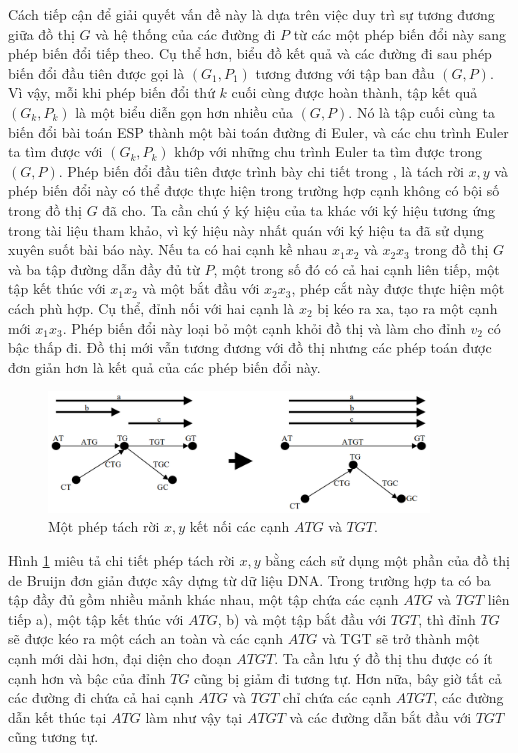 \documentclass[14pt, a4paper]{article}
\numberwithin{equation}{section}
\numberwithin{figure}{section}
\numberwithin{dl}{section}
\numberwithin{md}{section}
\numberwithin{bd}{section}
\numberwithin{dn}{section}
\numberwithin{hq}{section}
\begin{document}
    Cách tiếp cận để giải quyết vấn đề này là dựa trên việc duy trì sự tương đương giữa đồ thị $G$ và hệ thống của các đường đi $P$ từ các một phép biến đổi này sang phép biến đổi tiếp theo.
    Cụ thể hơn, biểu đồ kết quả và các đường đi sau phép biến đổi đầu tiên được gọi là $(G_1, P_1)$ tương đương với tập ban đầu $(G, P)$.
    Vì vậy, mỗi khi phép biến đổi thứ $k$ cuối cùng được hoàn thành, tập kết quả $(G_k, P_k)$ là một biểu diễn gọn hơn nhiều của $(G, P)$.
    Nó là tập cuối cùng ta biến đổi bài toán ESP thành một bài toán đường đi Euler, và các chu trình Euler ta tìm được với $(G_k, P_k)$ khớp với những chu trình Euler ta tìm được trong $(G, P)$.
    Phép biến đổi đầu tiên được trình bày chi tiết trong \cite{pevzner2001eulerian}, \cite{pevzner2001new} là tách rời $x, y$ và phép biến đổi này có thể được thực hiện trong trường hợp cạnh không có bội số trong đồ thị $G$ đã cho.
    Ta cần chú ý ký hiệu của ta khác với ký hiệu tương ứng trong tài liệu tham khảo, vì ký hiệu này nhất quán với ký hiệu ta đã sử dụng xuyên suốt bài báo này.
    Nếu ta có hai cạnh kề nhau $x_1 x_2$ và $x_2 x_3$ trong đồ thị $G$ và ba tập đường dẫn đầy đủ từ $P$, một trong số đó có cả hai cạnh liên tiếp, một tập kết thúc với $x_1 x_2$ và một bắt đầu với $x_2 x_3$, phép cắt này được thực hiện một cách phù hợp. Cụ thể, đỉnh nối với hai cạnh là $x_2$ bị kéo ra xa, tạo ra một cạnh mới $x_1 x_3$.
    Phép biến đổi này loại bỏ một cạnh khỏi đồ thị và làm cho đỉnh $v_2$ có bậc thấp đi.
    Đồ thị mới vẫn tương đương với đồ thị nhưng các phép toán được đơn giản hơn là kết quả của các phép biến đổi này.

    \begin{figure}[h!]
        \centering
        \includegraphics[width=0.9\textwidth]{6.png}
        \caption{Một phép tách rời $x, y$ kết nối các cạnh $ATG$ và $TGT$.}
        \label{fig:6}
    \end{figure}

    Hình \ref{fig:6} miêu tả chi tiết phép tách rời $x, y$ bằng cách sử dụng một phần của đồ thị de Bruijn đơn giản được xây dựng từ dữ liệu DNA.
    Trong trường hợp ta có ba tập đầy đủ gồm nhiều mảnh khác nhau, một tập chứa các cạnh $ATG$ và $TGT$  liên tiếp a), một tập kết thúc với $ATG$, b) và một tập bắt đầu với $TGT$, thì đỉnh $TG$ sẽ được kéo ra một cách an toàn và các cạnh $ATG$ và TGT sẽ trở thành một cạnh mới dài hơn, đại diện cho đoạn $ATGT$.
    Ta cần lưu ý đồ thị thu được có ít cạnh hơn và bậc của đỉnh $TG$ cũng bị giảm đi tương tự.
    Hơn nữa, bây giờ tất cả các đường đi chứa cả hai cạnh $ATG$ và $TGT$ chỉ chứa các cạnh $ATGT$, các đường dẫn kết thúc tại $ATG$ làm như vậy tại $ATGT$ và các đường dẫn bắt đầu với $TGT$ cũng tương tự.
\end{document}
